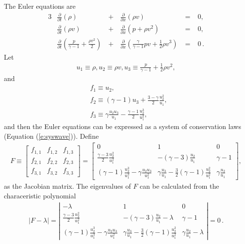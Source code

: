 \documentclass[letterpaper,12pt,dvips]{article}
\numberwithin{equation}{section}
\begin{document}
The Euler equations are
\begin{alignat}{3}
  & \frac{\partial}{\partial t}(\rho)
    &\,+\,& \frac{\partial}{\partial x}(\rho v) &\;=\;& 0
    , \label{e:euler1} \\
  & \frac{\partial}{\partial t}(\rho v)
    &\,+\,& \frac{\partial}{\partial x}(p+\rho v^2) &\;=\;& 0
    , \label{e:euler2} \\
  & \frac{\partial}{\partial t}(\frac{p}{\gamma-1}+\frac{\rho v^2}{2})
    &\,+\,& \frac{\partial}{\partial x}
      (\frac{\gamma}{\gamma-1}pv+\frac{1}{2}\rho v^3) &\;=\;& 0
    \,. \label{e:euler3}
  \end{alignat}
Let
\begin{align*}
  u_1 \equiv \rho, 
  u_2 \equiv \rho v, 
  u_3 \equiv \frac{p}{\gamma-1} + \frac{1}{2}\rho v^2,
\end{align*}
and
\begin{align*}
  &f_1 \equiv u_2, \\
  &f_2 \equiv (\gamma-1)u_3 + \frac{3-\gamma}{2}\frac{u_2^2}{u_1}, \\
  &f_3 \equiv \gamma\frac{u_2u_3}{u_1} 
             - \frac{\gamma-1}{2}\frac{u_2^3}{u_1^2}, 
\end{align*}
and then the Euler equations can be expressed as a system of conservation 
laws (Equation (\ref{e:syswave})).
Define 
\begin{align}
  F \equiv 
    \left[\begin{array}{ccc}
      f_{1,1} & f_{1,2} & f_{1,3} \\
      f_{2,1} & f_{2,2} & f_{2,3} \\
      f_{3,1} & f_{3,2} & f_{3,3} 
    \end{array}\right]
    = 
    \left[\begin{array}{ccc}
      0 & 1 & 0 \\
      \frac{\gamma-3}{2}\frac{u_2^2}{u_1^2} & 
      -(\gamma-3)\frac{u_2}{u_1} & 
      \gamma-1 \\
      (\gamma-1)\frac{u_2^3}{u_1^3} - \gamma\frac{u_2u_3}{u_1^2} & 
      \gamma\frac{u_3}{u_1} - \frac{3}{2}(\gamma-1)\frac{u_2^2}{u_1^2} & 
      \gamma\frac{u_2}{u_1}
    \end{array}\right], \label{e:euler_jacobian}
\end{align}
as the Jacobian matrix.
The eigenvalues of $F$ can be calculated from the characeristic 
polynomial
\begin{align*}
  |F-\lambda| = 
    \left|\begin{array}{ccc}
      -\lambda & 1 & 0 \\
      \frac{\gamma-3}{2}\frac{u_2^2}{u_1^2} 
      & -(\gamma-3)\frac{u_2}{u_1} - \lambda
      & \gamma-1 \\
      (\gamma-1)\frac{u_2^3}{u_1^3} - \gamma\frac{u_2u_3}{u_1^2}
      & \gamma\frac{u_3}{u_1} - \frac{3}{2}(\gamma-1)\frac{u_2^2}{u_1^2}
      & \gamma\frac{u_2}{u_1} - \lambda
    \end{array}\right| = 0\,.
\end{align*}
\end{document}
